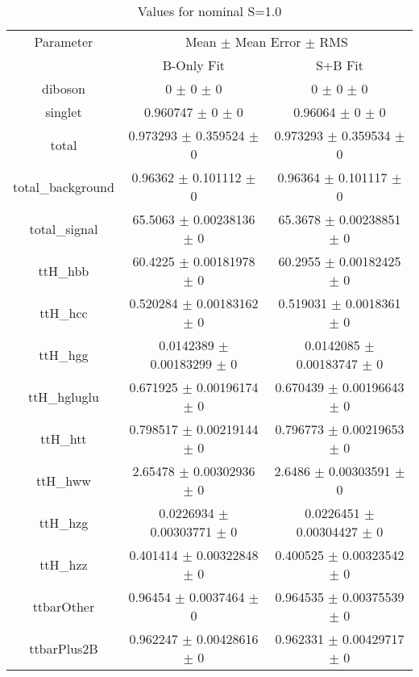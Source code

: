 \begin{table}
\centering
\caption{Values for nominal S=1.0}
\begin{tabular}{ccc}
\toprule
Parameter & \multicolumn{2}{c}{Mean $\pm$ Mean Error $\pm$ RMS}\\
 & B-Only Fit & S+B Fit\\
\midrule
diboson & \num{0} $\pm$ \num{0} $\pm$ \num{0} & \num{0} $\pm$ \num{0} $\pm$ \num{0}\\
singlet & \num{0.960747} $\pm$ \num{0} $\pm$ \num{0} & \num{0.96064} $\pm$ \num{0} $\pm$ \num{0}\\
total & \num{0.973293} $\pm$ \num{0.359524} $\pm$ \num{0} & \num{0.973293} $\pm$ \num{0.359534} $\pm$ \num{0}\\
total\_background & \num{0.96362} $\pm$ \num{0.101112} $\pm$ \num{0} & \num{0.96364} $\pm$ \num{0.101117} $\pm$ \num{0}\\
total\_signal & \num{65.5063} $\pm$ \num{0.00238136} $\pm$ \num{0} & \num{65.3678} $\pm$ \num{0.00238851} $\pm$ \num{0}\\
ttH\_hbb & \num{60.4225} $\pm$ \num{0.00181978} $\pm$ \num{0} & \num{60.2955} $\pm$ \num{0.00182425} $\pm$ \num{0}\\
ttH\_hcc & \num{0.520284} $\pm$ \num{0.00183162} $\pm$ \num{0} & \num{0.519031} $\pm$ \num{0.0018361} $\pm$ \num{0}\\
ttH\_hgg & \num{0.0142389} $\pm$ \num{0.00183299} $\pm$ \num{0} & \num{0.0142085} $\pm$ \num{0.00183747} $\pm$ \num{0}\\
ttH\_hgluglu & \num{0.671925} $\pm$ \num{0.00196174} $\pm$ \num{0} & \num{0.670439} $\pm$ \num{0.00196643} $\pm$ \num{0}\\
ttH\_htt & \num{0.798517} $\pm$ \num{0.00219144} $\pm$ \num{0} & \num{0.796773} $\pm$ \num{0.00219653} $\pm$ \num{0}\\
ttH\_hww & \num{2.65478} $\pm$ \num{0.00302936} $\pm$ \num{0} & \num{2.6486} $\pm$ \num{0.00303591} $\pm$ \num{0}\\
ttH\_hzg & \num{0.0226934} $\pm$ \num{0.00303771} $\pm$ \num{0} & \num{0.0226451} $\pm$ \num{0.00304427} $\pm$ \num{0}\\
ttH\_hzz & \num{0.401414} $\pm$ \num{0.00322848} $\pm$ \num{0} & \num{0.400525} $\pm$ \num{0.00323542} $\pm$ \num{0}\\
ttbarOther & \num{0.96454} $\pm$ \num{0.0037464} $\pm$ \num{0} & \num{0.964535} $\pm$ \num{0.00375539} $\pm$ \num{0}\\
ttbarPlus2B & \num{0.962247} $\pm$ \num{0.00428616} $\pm$ \num{0} & \num{0.962331} $\pm$ \num{0.00429717} $\pm$ \num{0}\\

\end{tabular}
\end{table}
